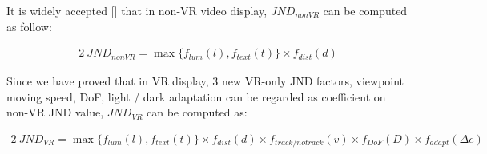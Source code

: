 It is widely accepted [] that in non-VR video display, $JND_{nonVR}$ can be computed as follow:

\begin{alignat}{2}\
JND_{nonVR} = \max \{ f_{lum}(l) , f_{text}(t)\} \times f_{dist}(d)
\end{alignat}

Since we have proved that in VR display, 3 new VR-only JND factors, viewpoint moving speed, DoF, light / dark adaptation can be regarded as coefficient on non-VR JND value, $JND_{VR}$ can be computed as:

\begin{alignat}{2}\
JND_{VR} = \max \{ f_{lum}(l) , f_{text}(t)\} \times f_{dist}(d) \times f_{track/notrack}(v) \times f_{DoF}(D) \times f_{adapt}(\Delta e)
\end{alignat}
